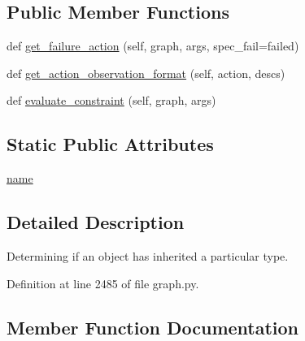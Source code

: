 \subsection*{Public Member Functions}
\begin{DoxyCompactItemize}
\item 
def \hyperlink{classlight__chats_1_1graph_1_1NotTypeConstraint_a006f37da6afe1dd06db790a6d19b07db}{get\+\_\+failure\+\_\+action} (self, graph, args, spec\+\_\+fail=\textquotesingle{}failed\textquotesingle{})
\item 
def \hyperlink{classlight__chats_1_1graph_1_1NotTypeConstraint_a5676df24e75c1823bd7b555a266de5f3}{get\+\_\+action\+\_\+observation\+\_\+format} (self, action, descs)
\item 
def \hyperlink{classlight__chats_1_1graph_1_1NotTypeConstraint_a14b047c243e378910ac24f6a2e7571e9}{evaluate\+\_\+constraint} (self, graph, args)
\end{DoxyCompactItemize}
\subsection*{Static Public Attributes}
\begin{DoxyCompactItemize}
\item 
\hyperlink{classlight__chats_1_1graph_1_1NotTypeConstraint_ad6119b9dbdfc0d1049e91e3f46832601}{name}
\end{DoxyCompactItemize}


\subsection{Detailed Description}
\begin{DoxyVerb}Determining if an object has inherited a particular type.
\end{DoxyVerb}
 

Definition at line 2485 of file graph.\+py.



\subsection{Member Function Documentation}
\mbox{\label{classlight__chats_1_1graph_1_1NotTypeConstraint_a14b047c243e378910ac24f6a2e7571e9}} 
